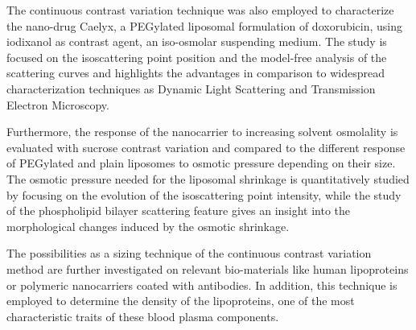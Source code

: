 The continuous contrast variation technique was also employed to characterize the nano-drug Caelyx, a PEGylated liposomal formulation of doxorubicin, using iodixanol as contrast agent, an iso-osmolar suspending medium. The study is focused on the isoscattering point position and the model-free analysis of the scattering curves and highlights the advantages in comparison to widespread characterization techniques as Dynamic Light Scattering and Transmission Electron Microscopy.


Furthermore, the response of the nanocarrier to increasing solvent osmolality is evaluated with sucrose contrast variation and compared to the different response of PEGylated and plain liposomes to osmotic pressure depending on their size. The osmotic pressure needed for the liposomal shrinkage is quantitatively studied by focusing on the evolution of the isoscattering point intensity, while the study of the phospholipid bilayer scattering feature gives an insight into the morphological changes induced by the osmotic shrinkage.

The possibilities as a sizing technique of the continuous contrast variation method are further investigated on relevant bio-materials like human lipoproteins or polymeric nanocarriers coated with antibodies. In addition, this technique is employed to determine the density of the lipoproteins, one of the most characteristic traits of these blood plasma components.





\normalsize


